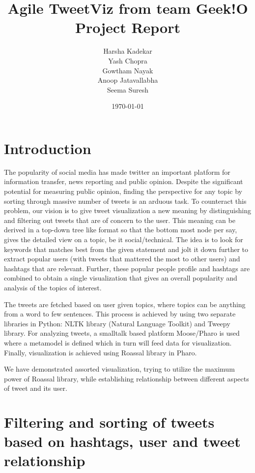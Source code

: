 \documentclass[11pt]{article}
\begin{document}
\title{%
 Agile TweetViz from team Geek!O\\
\large Project Report}
\author{Harsha Kadekar\\
  Yash Chopra\\
  Gowtham Nayak\\
  Anoop Jatavallabha\\
  Seema Suresh}
\date{\today}
\maketitle
\newpage
\tableofcontents
\newpage
\listoffigures
\newpage


\section{Introduction}
The popularity of social media has made twitter an important platform for information transfer, news reporting and public opinion. Despite the significant potential for measuring public opinion, finding the perspective for any topic by sorting through massive number of tweets is an arduous task. To counteract this problem, our vision is to give tweet visualization a new meaning by distinguishing and filtering out tweets that are of concern to the user. This meaning can be derived in a top-down tree like format so that the bottom most node per say, gives the detailed view on a topic, be it social/technical. The idea is to look for keywords that matches best from the given statement and jolt it down further to extract popular users (with tweets that mattered the most to other users) and hashtags that are relevant. Further, these popular people profile and hashtags are combined to obtain a single visualization that gives an overall popularity and analysis of the topics of interest.

 The tweets are fetched based on user given topics, where topics can be anything from a word to few sentences. This process is achieved by using two separate libraries in Python: NLTK library (Natural Language Toolkit) and Tweepy library. For analyzing tweets, a smalltalk based platform Moose/Pharo is used where a metamodel is defined which in turn will feed data for visualization. Finally, visualization is achieved using Roassal library in Pharo.
 
We have demonstrated assorted visualization, trying to utilize the maximum power of Roassal library, while establishing relationship between different aspects of tweet and its user. 

\section{Filtering and sorting of tweets based on hashtags, user and tweet relationship}
\end{document}
